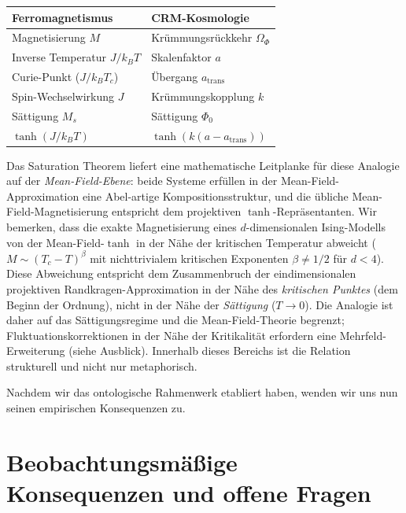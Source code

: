 \documentclass[aps,prd,twocolumn,superscriptaddress,nofootinbib]{revtex4-2}
\begin{document}
\begin{center}
\begin{tabular}{ll}
\hline
Ferromagnetismus & CRM-Kosmologie \\
\hline
Magnetisierung $M$ & Krümmungsrückkehr $\Omega_\Phi$ \\
Inverse Temperatur $J/k_BT$ & Skalenfaktor $a$ \\
Curie-Punkt ($J/k_BT_c$) & Übergang $a_{\mathrm{trans}}$ \\
Spin-Wechselwirkung $J$ & Krümmungskopplung $k$ \\
Sättigung $M_s$ & Sättigung $\Phi_0$ \\
$\tanh(J/k_BT)$ & $\tanh(k(a - a_{\mathrm{trans}}))$ \\
\hline
\end{tabular}
\end{center}

Das Saturation Theorem liefert eine mathematische Leitplanke für diese Analogie auf der \textit{Mean-Field-Ebene}: beide Systeme erfüllen in der Mean-Field-Approximation eine Abel-artige Kompositionsstruktur, und die übliche Mean-Field-Magnetisierung entspricht dem projektiven $\tanh$-Repräsentanten. Wir bemerken, dass die exakte Magnetisierung eines $d$-dimensionalen Ising-Modells von der Mean-Field-$\tanh$ in der Nähe der kritischen Temperatur abweicht ($M \sim (T_c - T)^{\beta}$ mit nichttrivialem kritischen Exponenten $\beta \neq 1/2$ für $d < 4$). Diese Abweichung entspricht dem Zusammenbruch der eindimensionalen projektiven Randkragen-Approximation in der Nähe des \textit{kritischen Punktes} (dem Beginn der Ordnung), nicht in der Nähe der \textit{Sättigung} ($T \to 0$). Die Analogie ist daher auf das Sättigungsregime und die Mean-Field-Theorie begrenzt; Fluktuationskorrektionen in der Nähe der Kritikalität erfordern eine Mehrfeld-Erweiterung (siehe Ausblick). Innerhalb dieses Bereichs ist die Relation strukturell und nicht nur metaphorisch.

Nachdem wir das ontologische Rahmenwerk etabliert haben, wenden wir uns nun seinen empirischen Konsequenzen zu.

\section{Beobachtungsmäßige Konsequenzen und offene Fragen}
\label{sec:observational}
\end{document}
